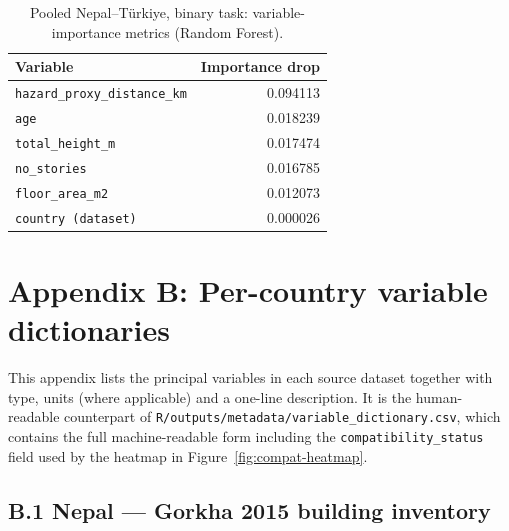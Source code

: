 \documentclass[11pt,a4paper]{article}
\begin{document}
\begin{table}[!h]
\centering
\caption{Pooled Nepal--T\"urkiye, binary task: variable-importance
metrics (Random Forest).}
\label{tab:imp-pooled-2}
\small
\begin{tabular}{l r}
\toprule
Variable & Importance drop \\
\midrule
\texttt{hazard\_proxy\_distance\_km} & 0.094113 \\
\texttt{age}                          & 0.018239 \\
\texttt{total\_height\_m}             & 0.017474 \\
\texttt{no\_stories}                  & 0.016785 \\
\texttt{floor\_area\_m2}              & 0.012073 \\
\texttt{country (dataset)}            & 0.000026 \\
\bottomrule
\end{tabular}
\end{table}


\newpage
\section*{Appendix B: Per-country variable dictionaries}

\noindent
This appendix lists the principal variables in each source dataset
together with type, units (where applicable) and a one-line
description. It is the human-readable counterpart of
\texttt{R/outputs/metadata/variable\_dictionary.csv}, which
contains the full machine-readable form including the
\texttt{compatibility\_status} field used by the heatmap in
Figure~\ref{fig:compat-heatmap}.

\subsection*{B.1 \quad Nepal --- Gorkha 2015 building inventory}
\end{document}
